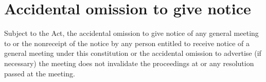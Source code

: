 \section{Accidental omission to give notice}

Subject to the Act, the accidental omission to give notice of any general meeting to or the nonreceipt of the notice by any person entitled to receive notice of a general meeting under this constitution or the accidental omission to advertise (if necessary) the meeting does not invalidate the proceedings at or any resolution passed at the meeting. 